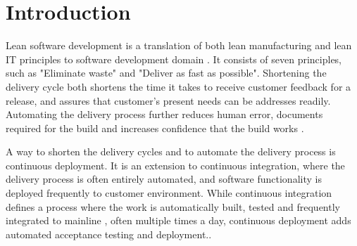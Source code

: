 \documentclass[conference]{IEEEtran}
\begin{document}
%


\IEEEpeerreviewmaketitle




%



\section{Introduction} %
Lean software development is a translation of both lean manufacturing and lean IT principles to software development domain \cite{poppendieck2003lean}. It consists of seven principles, such as "Eliminate waste" and "Deliver as fast as possible". Shortening the delivery cycle both shortens the time it takes to receive customer feedback for a release, and assures that customer's present needs can be addresses readily. Automating the delivery process further reduces human error, documents required for the build and increases confidence that the build works \cite{cdbook}.

A way to shorten the delivery cycles and to automate the delivery process is continuous deployment. It is an extension to continuous integration, where the delivery process is often entirely automated, and software functionality is deployed frequently to customer environment. While continuous integration defines a process where the work is automatically built, tested and frequently integrated to mainline \cite{fowler2006continuous}, often multiple times a day, continuous deployment adds automated acceptance testing and deployment.. %
\end{document}
